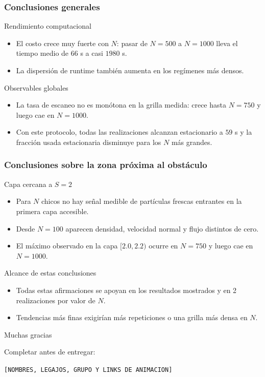 \documentclass{beamer}
\newcommand{\placeholder}[1]{\textcolor{tpblue}{\texttt{[#1]}}}
\begin{document}
\begin{frame}
  \frametitle{Conclusiones generales}
  \small
  \begin{block}{Rendimiento computacional}
    \begin{itemize}
      \item El costo crece muy fuerte con $N$: pasar de $N=500$ a $N=1000$ lleva el tiempo medio de $66$ s a casi $1980$ s.
      \item La dispersi\'on de runtime tambi\'en aumenta en los reg\'imenes m\'as densos.
    \end{itemize}
  \end{block}

  \begin{block}{Observables globales}
    \begin{itemize}
      \item La tasa de escaneo no es mon\'otona en la grilla medida: crece hasta $N=750$ y luego cae en $N=1000$.
      \item Con este protocolo, todas las realizaciones alcanzan estacionario a $59$ s y la fracci\'on usada estacionaria disminuye para los $N$ m\'as grandes.
    \end{itemize}
  \end{block}
\end{frame}

\begin{frame}
  \frametitle{Conclusiones sobre la zona pr\'oxima al obst\'aculo}
  \footnotesize
  \begin{block}{Capa cercana a $S = 2$}
    \begin{itemize}
      \item Para $N$ chicos no hay se\~nal medible de part\'iculas frescas entrantes en la primera capa accesible.
      \item Desde $N=100$ aparecen densidad, velocidad normal y flujo distintos de cero.
      \item El m\'aximo observado en la capa $[2.0,2.2)$ ocurre en $N=750$ y luego cae en $N=1000$.
    \end{itemize}
  \end{block}

  \begin{block}{Alcance de estas conclusiones}
    \begin{itemize}
      \item Todas estas afirmaciones se apoyan en los resultados mostrados y en 2 realizaciones por valor de $N$.
      \item Tendencias m\'as finas exigir\'ian m\'as repeticiones o una grilla m\'as densa en $N$.
    \end{itemize}
  \end{block}
\end{frame}

\begin{frame}
  \begin{center}
    \vspace{1.8cm}
    {\LARGE Muchas gracias}

    \vspace{0.8cm}
    {\small Completar antes de entregar:\par}
    {\small \placeholder{NOMBRES, LEGAJOS, GRUPO Y LINKS DE ANIMACION}}
  \end{center}
\end{frame}
\end{document}
